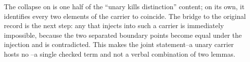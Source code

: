 \documentclass[11pt]{article}
\begin{document}
The collapse on   is one half of
the ``unary kills distinction'' content; on its own, it identifies every
two elements of the carrier to coincide.  The bridge to the original
record is the next step: any  that injects
into such a carrier is immediately impossible, because the two
separated boundary points become equal under the injection and
 is contradicted.  This makes the joint
statement--a unary carrier hosts no --a single
checked term and not a verbal combination of two lemmas.

\begin{code}%
\>[0]\<%
\\
\>[0]\AgdaSpace{}%
\AgdaSymbol{:}\<%
\\
\>[0][@{}l@{\AgdaIndent{0}}]%
\>[2]\AgdaSymbol{(}\AgdaSpace{}%
\AgdaSymbol{:}\AgdaSpace{}%
\AgdaSpace{}%
\AgdaSymbol{)}\AgdaSpace{}%
\<%
\\
%
\>[2]\AgdaSymbol{(}%
\>[6]\AgdaSymbol{:}\AgdaSpace{}%
\AgdaSymbol{)}\AgdaSpace{}%
\<%
\\
%
\>[2]\AgdaSymbol{(}%
\>[6]\AgdaSymbol{:}\AgdaSpace{}%
\AgdaSpace{}%
\AgdaSpace{}%
\AgdaSpace{}%
\AgdaSpace{}%
\AgdaSymbol{)}\AgdaSpace{}%
\<%
\\
%
\>[2]\AgdaSymbol{((}\AgdaSpace{}%
\AgdaSpace{}%
\AgdaSymbol{:}\AgdaSpace{}%
\AgdaSpace{}%
\AgdaSymbol{)}\AgdaSpace{}%
\AgdaSpace{}%
\AgdaSpace{}%
\AgdaSpace{}%
\AgdaSpace{}%
\AgdaSpace{}%
\AgdaSpace{}%
\AgdaSpace{}%
\AgdaSpace{}%
\AgdaSpace{}%
\AgdaSymbol{)}\AgdaSpace{}%
\<%
\\
%
\>[2]\<%
\\
\>[0]\AgdaSpace{}%
\AgdaSpace{}%
\AgdaSpace{}%
\AgdaSpace{}%
\AgdaSpace{}%
\AgdaSymbol{=}\<%
\\
\>[0][@{}l@{\AgdaIndent{0}}]%
\>[2]\AgdaSpace{}%

\end{code}
\end{document}
